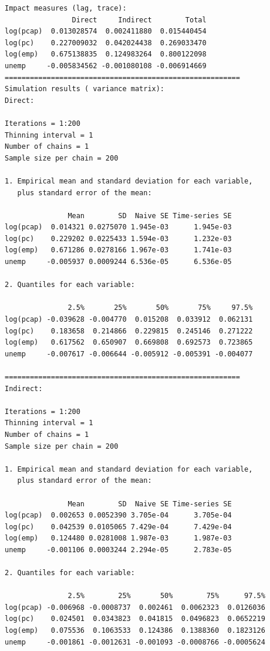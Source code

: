 \documentclass[
  letterpaper,
  DIV=11,
  numbers=noendperiod]{scrreprt}
\begin{document}
\begin{verbatim}
Impact measures (lag, trace):
                Direct     Indirect        Total
log(pcap)  0.013028574  0.002411880  0.015440454
log(pc)    0.227009032  0.042024438  0.269033470
log(emp)   0.675138835  0.124983264  0.800122098
unemp     -0.005834562 -0.001080108 -0.006914669
========================================================
Simulation results ( variance matrix):
Direct:

Iterations = 1:200
Thinning interval = 1 
Number of chains = 1 
Sample size per chain = 200 

1. Empirical mean and standard deviation for each variable,
   plus standard error of the mean:

               Mean        SD  Naive SE Time-series SE
log(pcap)  0.014321 0.0275070 1.945e-03      1.945e-03
log(pc)    0.229202 0.0225433 1.594e-03      1.232e-03
log(emp)   0.671286 0.0278166 1.967e-03      1.741e-03
unemp     -0.005937 0.0009244 6.536e-05      6.536e-05

2. Quantiles for each variable:

               2.5%       25%       50%       75%     97.5%
log(pcap) -0.039628 -0.004770  0.015208  0.033912  0.062131
log(pc)    0.183658  0.214866  0.229815  0.245146  0.271222
log(emp)   0.617562  0.650907  0.669808  0.692573  0.723865
unemp     -0.007617 -0.006644 -0.005912 -0.005391 -0.004077

========================================================
Indirect:

Iterations = 1:200
Thinning interval = 1 
Number of chains = 1 
Sample size per chain = 200 

1. Empirical mean and standard deviation for each variable,
   plus standard error of the mean:

               Mean        SD  Naive SE Time-series SE
log(pcap)  0.002653 0.0052390 3.705e-04      3.705e-04
log(pc)    0.042539 0.0105065 7.429e-04      7.429e-04
log(emp)   0.124480 0.0281008 1.987e-03      1.987e-03
unemp     -0.001106 0.0003244 2.294e-05      2.783e-05

2. Quantiles for each variable:

               2.5%        25%       50%        75%      97.5%
log(pcap) -0.006968 -0.0008737  0.002461  0.0062323  0.0126036
log(pc)    0.024501  0.0343823  0.041815  0.0496823  0.0652219
log(emp)   0.075536  0.1063533  0.124386  0.1388360  0.1823126
unemp     -0.001861 -0.0012631 -0.001093 -0.0008766 -0.0005624


\end{verbatim}
\end{document}
